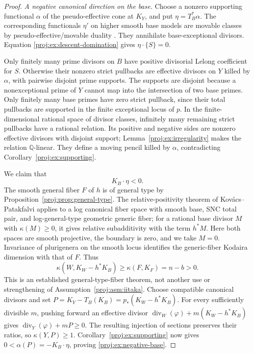 \documentclass[11pt,letterpaper]{article}
\theoremstyle{definition}
\theoremstyle{remark}
\begin{document}
\begin{proof}
 
 \emph{A negative canonical direction on the base.}
Choose a nonzero supporting functional \(\alpha\) of the
pseudo-effective cone at \(K_Y\), and put
\(\eta=T_B^*\alpha\). The corresponding functionals \(\eta'\)
on higher smooth base models are movable classes by
pseudo-effective/movable duality \cite[Theorem~0.2]{BDPP}.
They annihilate base-exceptional divisors. Equation
\eqref{proj:ex:descent-domination} gives \(\eta\cdot\{S\}=0\).

Only finitely many prime divisors on \(B\) have positive
divisorial Lelong coefficient for \(S\). Otherwise their
nonzero strict pullbacks are effective divisors on \(Y\)
killed by \(\alpha\), with pairwise disjoint prime supports.
The supports are disjoint because a nonexceptional prime of
\(Y\) cannot map into the intersection of two base primes.
Only finitely many base primes have zero strict pullback,
since their total pullbacks are supported in the finite
exceptional locus of \(p\). In the finite-dimensional rational
space of divisor classes, infinitely many remaining strict
pullbacks have a rational relation. Its positive and negative
sides are nonzero effective divisors with disjoint support;
Lemma~\ref{proj:ex:irregularity} makes the relation
\(\mathbb{Q}\)-linear. They define a moving pencil killed by
\(\alpha\), contradicting Corollary~\ref{proj:ex:supporting}.

We claim that
\begin{equation}\label{proj:ex:negative-base}
 K_B\cdot\eta<0.
\end{equation}
The smooth general fiber \(F\) of \(h\) is of general type by
Proposition~\ref{proj:prop:general-type}. The relative-positivity
theorem of Kov\'acs--Patakfalvi
\cite[Theorem~9.9]{Proj-KovacsPatakfalvi2017} applies to a log
canonical fiber space with smooth base, SNC total pair, and
log-general-type geometric generic fiber; for a rational base
divisor \(M\) with \(\kappa(M)\geq0\), it gives relative
subadditivity with the term \(h^*M\). Here both spaces are
smooth projective, the boundary is zero, and we take \(M=0\).
Invariance of plurigenera on the smooth locus identifies the
generic-fiber Kodaira dimension with that of \(F\). Thus
\begin{equation}\label{proj:ex:relative-positive}
 \kappa(W,K_W-h^*K_B)\geq \kappa(F,K_F)=n-b>0.
\end{equation}
This is an established general-type-fiber theorem, not another
use or strengthening of Assumption~\ref{proj:asm:iitaka}.
Choose compatible canonical divisors and set
\(P=K_Y-T_B(K_B)=p_*(K_W-h^*K_B)\).
For every sufficiently divisible \(m\), pushing forward an
effective divisor
\(\operatorname{div}_W(\varphi)+m(K_W-h^*K_B)\)
gives
\(\operatorname{div}_Y(\varphi)+mP\geq0\).
The resulting injection of sections preserves their ratios,
so \(\kappa(Y,P)\geq1\). Corollary~\ref{proj:ex:supporting} now gives
\(0<\alpha(P)=-K_B\cdot\eta\), proving
\eqref{proj:ex:negative-base}.


\end{proof}
\end{document}
